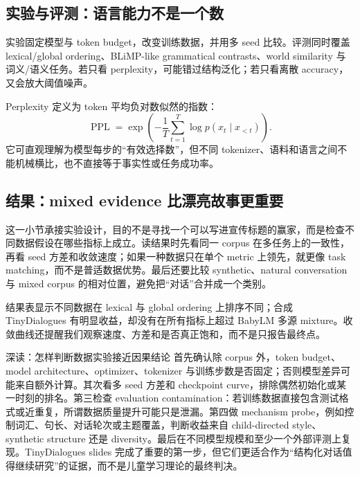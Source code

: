 \subsection{实验与评测：语言能力不是一个数}

实验固定模型与 token budget，改变训练数据，并用多 seed 比较。评测同时覆盖 lexical/global ordering、BLiMP-like grammatical contrasts、world similarity 与词义/语义任务。若只看 perplexity，可能错过结构泛化；若只看离散 accuracy，又会放大阈值噪声。





Perplexity 定义为 token 平均负对数似然的指数：
\[
\operatorname{PPL}=\exp\!\left(-\frac{1}{T}\sum_{t=1}^{T}\log p(x_t\mid x_{<t})\right).
\]
它可直观理解为模型每步的“有效选择数”，但不同 tokenizer、语料和语言之间不能机械横比，也不直接等于事实性或任务成功率。

\subsection{结果：mixed evidence 比漂亮故事更重要}

这一小节承接实验设计，目的不是寻找一个可以写进宣传标题的赢家，而是检查不同数据假设在哪些指标上成立。读结果时先看同一 corpus 在多任务上的一致性，再看 seed 方差和收敛速度；如果一种数据只在单个 metric 上领先，就更像 task matching，而不是普适数据优势。最后还要比较 synthetic、natural conversation 与 mixed corpus 的相对位置，避免把“对话”合并成一个类别。

结果表显示不同数据在 lexical 与 global ordering 上排序不同；合成 TinyDialogues 有明显收益，却没有在所有指标上超过 BabyLM 多源 mixture。收敛曲线还提醒我们观察速度、方差和是否真正饱和，而不是只报告最终点。







\begin{knowledgebox}{深读：怎样判断数据实验接近因果结论}
首先确认除 corpus 外，token budget、model architecture、optimizer、tokenizer 与训练步数是否固定；否则模型差异可能来自额外计算。其次看多 seed 方差和 checkpoint curve，排除偶然初始化或某一时刻的排名。第三检查 evaluation contamination：若训练数据直接包含测试格式或近重复，所谓数据质量提升可能只是泄漏。第四做 mechanism probe，例如控制词汇、句长、对话轮次或主题覆盖，判断收益来自 child-directed style、synthetic structure 还是 diversity。最后在不同模型规模和至少一个外部评测上复现。TinyDialogues slides 完成了重要的第一步，但它们更适合作为“结构化对话值得继续研究”的证据，而不是儿童学习理论的最终判决。
\end{knowledgebox}

